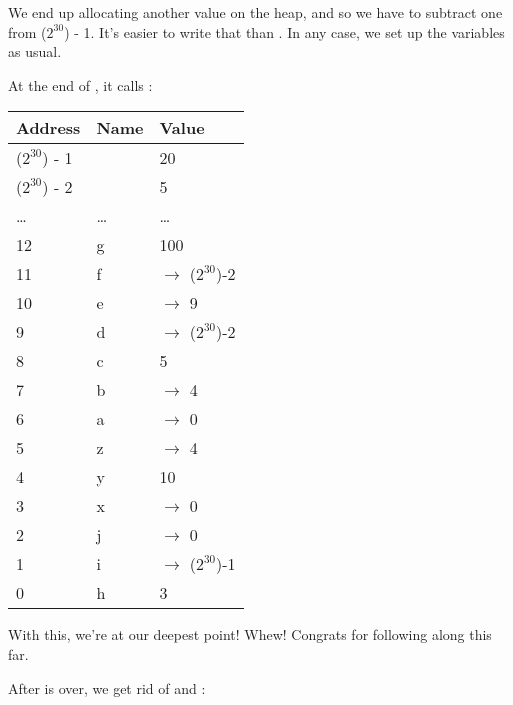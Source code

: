 We end up allocating another value on the heap, and so we have to subtract one from ($2^{30}$) - 1. It's easier to write that than 
. In any case, we set up the variables as usual.

At the end of , it calls :

\begin{table}[H]
  \begin{tabular}{|l|l|l|}
    \hline
    \textbf{Address} & \textbf{Name} & \textbf{Value} \\
    \hline
    ($2^{30}$) - 1 & & 20 \\
    \hline
    ($2^{30}$) - 2 & & 5 \\
    \hline
    \ldots & \ldots & \ldots \\
    12 & g & 100 \\
    \hline
    11 & f & $\rightarrow$ ($2^{30}$)-2\\
    \hline
    10 & e & $\rightarrow$ 9 \\
    \hline
    9 & d & $\rightarrow$ ($2^{30}$)-2 \\
    \hline
    8 & c & 5 \\
    \hline
    7 & b & $\rightarrow$ 4 \\
    \hline
    6 & a & $\rightarrow$ 0 \\
    \hline
    5 & z & $\rightarrow$ 4 \\
    \hline
    4 & y & 10 \\
    \hline
    3 & x & $\rightarrow$ 0 \\
    \hline
    2 & j & $\rightarrow$ 0 \\
    \hline
    1 & i & $\rightarrow$ ($2^{30}$)-1 \\
    \hline
    0 & h & 3 \\
    \hline
  \end{tabular}
\end{table}

With this, we're at our deepest point! Whew! Congrats for following along this far.

\blank

After  is over, we get rid of  and :

